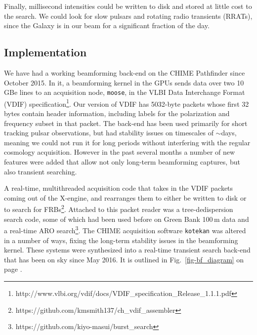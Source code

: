 Finally, millisecond intensities could be written to disk and stored
at little cost to the search.
We could look for slow pulsars 
and rotating radio transients (RRATs), since the 
Galaxy is in our beam for a significant fraction of the day.

\subsection{Implementation}
\label{sec:implementation}

We have had a working beamforming back-end on the CHIME 
Pathfinder since October 2015. 
In it, a beamforming kernel in the GPUs sends data over two 10 GBe
lines to an acquisition node, {\tt moose}, 
in the VLBI Data Interchange Format (VDIF) 
specification\footnote{http://www.vlbi.org/vdif/docs/VDIF\_specification\_Release\_1.1.1.pdf}. Our version of VDIF has 5032-byte packets whose first 
32 bytes contain header information, including labels for the 
polarization and frequency subset in that packet.
The back-end has been used primarily 
for short tracking pulsar observations, but had stability issues 
on timescales of $\sim$days, meaning we could not run it 
for long periods without interfering with the regular cosmology acquisition. 
However in the past several months a number of new features 
were added that allow not only long-term beamforming captures, 
but also transient searching. 
 
A real-time, multithreaded acquisition code that takes in the VDIF 
packets coming out of the X-engine, and rearranges them to either 
be written to disk or to search for 
FRBs\footnote{https://github.com/kmsmith137/ch\_vdif\_assembler}. Attached 
to this packet reader was a tree-dedispersion search code, some of 
which had been used before on Green Bank 100\,m data and a real-time ARO 
search\footnote{https://github.com/kiyo-masui/burst\_search}.
The CHIME acquisition software {\tt kotekan} was 
altered in a number of ways, fixing the long-term 
stability issues in the beamforming kernel. These systems 
were synthesized into a real-time transient search back-end 
that has been on sky since May 2016. 
It is outlined in Fig.~\ref{fig-bf_diagram}
on page \pageref{fig-bf_diagram}. 


